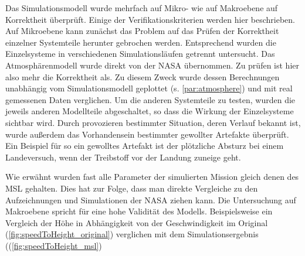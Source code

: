 Das Simulationsmodell wurde mehrfach auf Mikro- wie auf Makroebene auf Korrektheit überprüft. Einige der Verifikationskriterien werden hier beschrieben. Auf Mikroebene kann zunächst das Problem auf das Prüfen der Korrektheit einzelner Systemteile herunter gebrochen werden. Entsprechend wurden die Einzelsysteme in verschiedenen Simulationsläufen getrennt untersucht. Das Atmosphärenmodell wurde direkt von der NASA übernommen. Zu prüfen ist hier also mehr die Korrektheit als. Zu diesem Zweck wurde dessen Berechnungen unabhängig vom Simulationsmodell geplottet (s. \ref{par:atmosphere}) und mit real gemessenen Daten \cite{Blanchard1980} verglichen. Um die anderen Systemteile zu testen, wurden die jeweils anderen Modellteile abgeschaltet, so dass die Wirkung der Einzelsysteme sichtbar wird. Durch provozieren bestimmter Situation, deren Verlauf bekannt ist, wurde außerdem das Vorhandensein bestimmter gewollter Artefakte überprüft. Ein Beispiel für so ein gewolltes Artefakt ist der plötzliche Absturz bei einem Landeversuch, wenn der Treibstoff vor der Landung zuneige geht.

Wie erwähnt wurden fast alle Parameter der simulierten Mission gleich denen des MSL gehalten. Dies hat zur Folge, dass man direkte Vergleiche zu den Aufzeichnungen und Simulationen der NASA ziehen kann. Die Untersuchung auf Makroebene spricht für eine hohe Validität des Modells. Beispielsweise ein Vergleich der Höhe in Abhängigkeit von der Geschwindigkeit im Original (\ref{fig:speedToHeight_original}) verglichen mit dem Simulationsergebnis ((\ref{fig:speedToHeight_msl})
